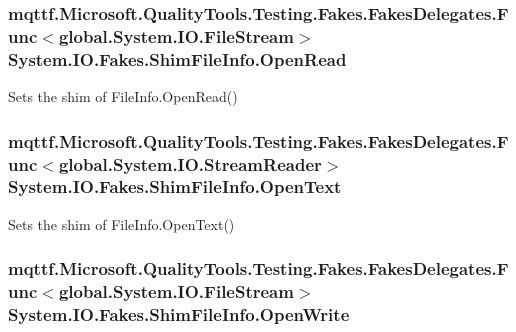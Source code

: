 \hypertarget{class_system_1_1_i_o_1_1_fakes_1_1_shim_file_info_ab3d6121ee5f9a29a8a6219d25783750f}{
\subsubsection[{Open\-Read}]{\setlength{\rightskip}{0pt plus 5cm}mqttf.\-Microsoft.\-Quality\-Tools.\-Testing.\-Fakes.\-Fakes\-Delegates.\-Func$<$global.\-System.\-I\-O.\-File\-Stream$>$ System.\-I\-O.\-Fakes.\-Shim\-File\-Info.\-Open\-Read\hspace{0.3cm}{\ttfamily [set]}}}\label{class_system_1_1_i_o_1_1_fakes_1_1_shim_file_info_ab3d6121ee5f9a29a8a6219d25783750f}


Sets the shim of File\-Info.\-Open\-Read()

\hypertarget{class_system_1_1_i_o_1_1_fakes_1_1_shim_file_info_ad329c72f6f7c5c7f2ce382c012a78ecf}{
\subsubsection[{Open\-Text}]{\setlength{\rightskip}{0pt plus 5cm}mqttf.\-Microsoft.\-Quality\-Tools.\-Testing.\-Fakes.\-Fakes\-Delegates.\-Func$<$global.\-System.\-I\-O.\-Stream\-Reader$>$ System.\-I\-O.\-Fakes.\-Shim\-File\-Info.\-Open\-Text\hspace{0.3cm}{\ttfamily [set]}}}\label{class_system_1_1_i_o_1_1_fakes_1_1_shim_file_info_ad329c72f6f7c5c7f2ce382c012a78ecf}


Sets the shim of File\-Info.\-Open\-Text()

\hypertarget{class_system_1_1_i_o_1_1_fakes_1_1_shim_file_info_a7f1b5a79fff814e98c4c6592c77099ed}{
\subsubsection[{Open\-Write}]{\setlength{\rightskip}{0pt plus 5cm}mqttf.\-Microsoft.\-Quality\-Tools.\-Testing.\-Fakes.\-Fakes\-Delegates.\-Func$<$global.\-System.\-I\-O.\-File\-Stream$>$ System.\-I\-O.\-Fakes.\-Shim\-File\-Info.\-Open\-Write\hspace{0.3cm}{\ttfamily [set]}}}\label{class_system_1_1_i_o_1_1_fakes_1_1_shim_file_info_a7f1b5a79fff814e98c4c6592c77099ed}


